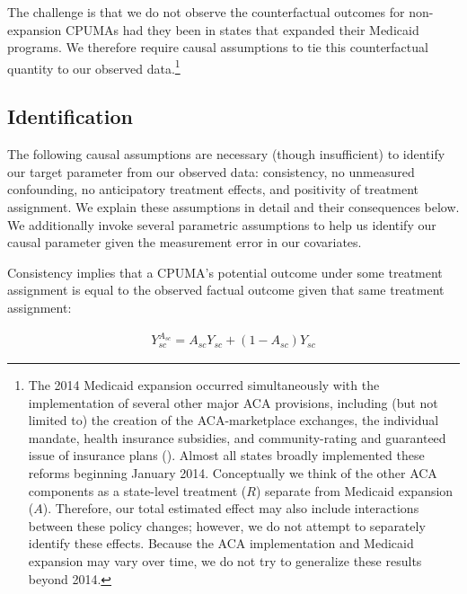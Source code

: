 \documentclass[aoas]{imsart}
\theoremstyle{plain}
\theoremstyle{remark}
\begin{document}
The challenge is that we do not observe the counterfactual outcomes for non-expansion CPUMAs had they been in states that expanded their Medicaid programs. We therefore require causal assumptions to tie this counterfactual quantity to our observed data.\footnote{The 2014 Medicaid expansion occurred simultaneously with the implementation of several other major ACA provisions, including (but not limited to) the creation of the ACA-marketplace exchanges, the individual mandate, health insurance subsidies, and community-rating and guaranteed issue of insurance plans (\cite{courtemanche2017early}). Almost all states broadly implemented these reforms beginning January 2014. Conceptually we think of the other ACA components as a state-level treatment ($R$) separate from Medicaid expansion ($A$). Therefore, our total estimated effect may also include interactions between these policy changes; however, we do not attempt to separately identify these effects. Because the ACA implementation and Medicaid expansion may vary over time, we do not try to generalize these results beyond 2014.} 

\subsection{Identification}

The following causal assumptions are necessary (though insufficient) to identify our target parameter from our observed data: consistency, no unmeasured confounding, no anticipatory treatment effects, and positivity of treatment assignment. We explain these assumptions in detail and their consequences below. We additionally invoke several parametric assumptions to help us identify our causal parameter given the measurement error in our covariates.

Consistency implies that a CPUMA's potential outcome under some treatment assignment is equal to the observed factual outcome given that same treatment assignment: 

\begin{align*}
Y_{sc}^{A_{sc}} = A_{sc}Y_{sc} + (1 - A_{sc})Y_{sc}
\end{align*}
\end{document}
